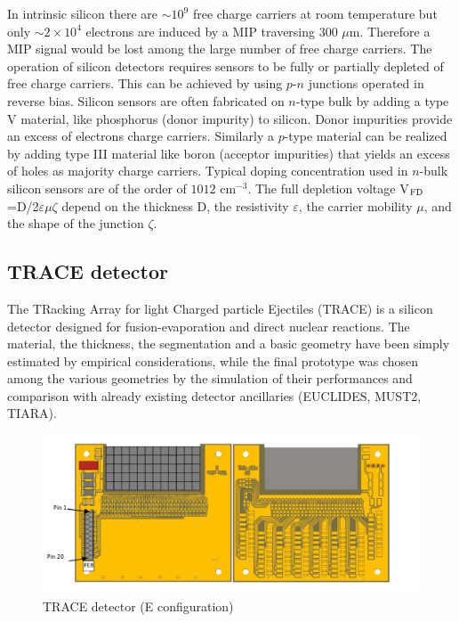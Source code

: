 \bigbreak

In intrinsic silicon there are $\sim 10^9$ free charge carriers at room
temperature but only $\sim 2 \times 10^4$ electrons are induced by a MIP
traversing 300 $\mu$m. Therefore a MIP signal would be lost among the large
number of free charge carriers. The operation of silicon detectors requires
sensors to be fully or partially depleted of free charge carriers. This can
be achieved by using $p$-$n$ junctions operated in reverse bias. Silicon sensors
are often fabricated on $n$-type bulk by adding a type V material, like
phosphorus  (donor impurity) to silicon. Donor impurities provide an
excess of electrons charge carriers. Similarly a $p$-type material can be
realized by adding type III material like boron  (acceptor impurities)
that yields an excess of holes as majority charge carriers. Typical doping
concentration used in $n$-bulk silicon sensors are of the order of
$1012$ cm$^{-3}$. The full depletion voltage V$_{\textup{FD}}$=D/2$\varepsilon
\mu \zeta$ depend on the thickness D, the resistivity $\varepsilon$, the
carrier mobility $\mu$, and the shape of the junction $\zeta$.

\bigbreak

\subsection{TRACE detector}

The TRacking Array for light Charged particle Ejectiles (TRACE) is a silicon
detector designed for fusion-evaporation and direct nuclear reactions.
The material, the thickness, the segmentation and a basic geometry have been
simply estimated by empirical considerations, while the final prototype was
chosen among the various geometries by the simulation of their performances
and comparison with already existing detector ancillaries (EUCLIDES, MUST2,
TIARA).

\bigbreak

\begin{figure}[h]
  \centering
  \includegraphics[scale=.65]{img/trace_e.png}
  \caption{TRACE detector (E configuration)}
  \label{chain}
\end{figure}


